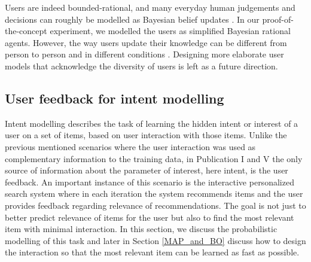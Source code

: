 \documentclass[dissertation,math,vertlayout,pdfa,colorlinks]{aaltoseries}
\begin{document}

Users are indeed bounded-rational, and many everyday human judgements and decisions can roughly be modelled as Bayesian belief updates \cite{griffiths2006optimal}. In our proof-of-the-concept experiment, we modelled the users as simplified Bayesian rational agents. However, the way users update their knowledge can be different from person to person and in different conditions \cite{Hullman}. Designing more elaborate user models that acknowledge the diversity of users is left as a future direction.


\subsection{User feedback for intent modelling}\label{feedback_intent_modelling}

Intent modelling describes the task of learning the hidden intent or interest of a user on a set of items, based on user interaction with those items. Unlike the previous mentioned scenarios where the user interaction was used as complementary information to the training data, in Publication I and V the only source of information about the parameter of interest, here intent, is the user feedback. An important instance of this scenario is the interactive personalized search system where in each iteration the system recommends items and the user provides feedback regarding relevance of recommendations. The goal is not just to better predict relevance of items for the user but also to find the most relevant item with minimal interaction. In this section, we discuss the probabilistic modelling of this task and later in Section \ref{MAP_and_BO} discuss how to design the interaction so that the most relevant item can be learned as fast as possible. 
\end{document}
